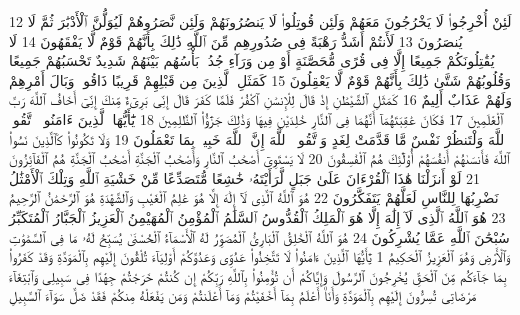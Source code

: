 {\tiny\colorbox{cl_aya}{12}} لَئِنْ أُخْرِجُوا۟ لَا يَخْرُجُونَ مَعَهُمْ وَلَئِن قُوتِلُوا۟ لَا يَنصُرُونَهُمْ وَلَئِن نَّصَرُوهُمْ لَيُوَلُّنَّ ٱلْأَدْبَٰرَ ثُمَّ لَا يُنصَرُونَ
{\tiny\colorbox{cl_aya}{13}} لَأَنتُمْ أَشَدُّ رَهْبَةً فِى صُدُورِهِم مِّنَ ٱللَّهِ ذَٰلِكَ بِأَنَّهُمْ قَوْمٌ لَّا يَفْقَهُونَ
{\tiny\colorbox{cl_aya}{14}} لَا يُقَٰتِلُونَكُمْ جَمِيعًا إِلَّا فِى قُرًى مُّحَصَّنَةٍ أَوْ مِن وَرَآءِ جُدُرٍۭ بَأْسُهُم بَيْنَهُمْ شَدِيدٌ تَحْسَبُهُمْ جَمِيعًا وَقُلُوبُهُمْ شَتَّىٰ ذَٰلِكَ بِأَنَّهُمْ قَوْمٌ لَّا يَعْقِلُونَ
{\tiny\colorbox{cl_aya}{15}} كَمَثَلِ ٱلَّذِينَ مِن قَبْلِهِمْ قَرِيبًا ذَاقُوا۟ وَبَالَ أَمْرِهِمْ وَلَهُمْ عَذَابٌ أَلِيمٌ
{\tiny\colorbox{cl_aya}{16}} كَمَثَلِ ٱلشَّيْطَٰنِ إِذْ قَالَ لِلْإِنسَٰنِ ٱكْفُرْ فَلَمَّا كَفَرَ قَالَ إِنِّى بَرِىٓءٌ مِّنكَ إِنِّىٓ أَخَافُ ٱللَّهَ رَبَّ ٱلْعَٰلَمِينَ
{\tiny\colorbox{cl_aya}{17}} فَكَانَ عَٰقِبَتَهُمَآ أَنَّهُمَا فِى ٱلنَّارِ خَٰلِدَيْنِ فِيهَا وَذَٰلِكَ جَزَٰٓؤُا۟ ٱلظَّٰلِمِينَ
{\tiny\colorbox{cl_aya}{18}} يَٰٓأَيُّهَا ٱلَّذِينَ ءَامَنُوا۟ ٱتَّقُوا۟ ٱللَّهَ وَلْتَنظُرْ نَفْسٌ مَّا قَدَّمَتْ لِغَدٍ وَٱتَّقُوا۟ ٱللَّهَ إِنَّ ٱللَّهَ خَبِيرٌۢ بِمَا تَعْمَلُونَ
{\tiny\colorbox{cl_aya}{19}} وَلَا تَكُونُوا۟ كَٱلَّذِينَ نَسُوا۟ ٱللَّهَ فَأَنسَىٰهُمْ أَنفُسَهُمْ أُو۟لَٰٓئِكَ هُمُ ٱلْفَٰسِقُونَ
{\tiny\colorbox{cl_aya}{20}} لَا يَسْتَوِىٓ أَصْحَٰبُ ٱلنَّارِ وَأَصْحَٰبُ ٱلْجَنَّةِ أَصْحَٰبُ ٱلْجَنَّةِ هُمُ ٱلْفَآئِزُونَ
{\tiny\colorbox{cl_aya}{21}} لَوْ أَنزَلْنَا هَٰذَا ٱلْقُرْءَانَ عَلَىٰ جَبَلٍ لَّرَأَيْتَهُۥ خَٰشِعًا مُّتَصَدِّعًا مِّنْ خَشْيَةِ ٱللَّهِ وَتِلْكَ ٱلْأَمْثَٰلُ نَضْرِبُهَا لِلنَّاسِ لَعَلَّهُمْ يَتَفَكَّرُونَ
{\tiny\colorbox{cl_aya}{22}} هُوَ ٱللَّهُ ٱلَّذِى لَآ إِلَٰهَ إِلَّا هُوَ عَٰلِمُ ٱلْغَيْبِ وَٱلشَّهَٰدَةِ هُوَ ٱلرَّحْمَٰنُ ٱلرَّحِيمُ
{\tiny\colorbox{cl_aya}{23}} هُوَ ٱللَّهُ ٱلَّذِى لَآ إِلَٰهَ إِلَّا هُوَ ٱلْمَلِكُ ٱلْقُدُّوسُ ٱلسَّلَٰمُ ٱلْمُؤْمِنُ ٱلْمُهَيْمِنُ ٱلْعَزِيزُ ٱلْجَبَّارُ ٱلْمُتَكَبِّرُ سُبْحَٰنَ ٱللَّهِ عَمَّا يُشْرِكُونَ
{\tiny\colorbox{cl_aya}{24}} هُوَ ٱللَّهُ ٱلْخَٰلِقُ ٱلْبَارِئُ ٱلْمُصَوِّرُ لَهُ ٱلْأَسْمَآءُ ٱلْحُسْنَىٰ يُسَبِّحُ لَهُۥ مَا فِى ٱلسَّمَٰوَٰتِ وَٱلْأَرْضِ وَهُوَ ٱلْعَزِيزُ ٱلْحَكِيمُ
{\tiny\colorbox{cl_aya}{1}} يَٰٓأَيُّهَا ٱلَّذِينَ ءَامَنُوا۟ لَا تَتَّخِذُوا۟ عَدُوِّى وَعَدُوَّكُمْ أَوْلِيَآءَ تُلْقُونَ إِلَيْهِم بِٱلْمَوَدَّةِ وَقَدْ كَفَرُوا۟ بِمَا جَآءَكُم مِّنَ ٱلْحَقِّ يُخْرِجُونَ ٱلرَّسُولَ وَإِيَّاكُمْ أَن تُؤْمِنُوا۟ بِٱللَّهِ رَبِّكُمْ إِن كُنتُمْ خَرَجْتُمْ جِهَٰدًا فِى سَبِيلِى وَٱبْتِغَآءَ مَرْضَاتِى تُسِرُّونَ إِلَيْهِم بِٱلْمَوَدَّةِ وَأَنَا۠ أَعْلَمُ بِمَآ أَخْفَيْتُمْ وَمَآ أَعْلَنتُمْ وَمَن يَفْعَلْهُ مِنكُمْ فَقَدْ ضَلَّ سَوَآءَ ٱلسَّبِيلِ
